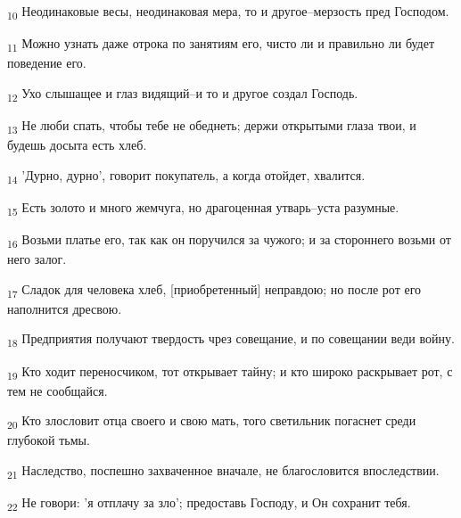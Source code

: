 \begin{tcolorbox}
\textsubscript{10} Неодинаковые весы, неодинаковая мера, то и другое--мерзость пред Господом.
\end{tcolorbox}
\begin{tcolorbox}
\textsubscript{11} Можно узнать даже отрока по занятиям его, чисто ли и правильно ли будет поведение его.
\end{tcolorbox}
\begin{tcolorbox}
\textsubscript{12} Ухо слышащее и глаз видящий--и то и другое создал Господь.
\end{tcolorbox}
\begin{tcolorbox}
\textsubscript{13} Не люби спать, чтобы тебе не обеднеть; держи открытыми глаза твои, и будешь досыта есть хлеб.
\end{tcolorbox}
\begin{tcolorbox}
\textsubscript{14} 'Дурно, дурно', говорит покупатель, а когда отойдет, хвалится.
\end{tcolorbox}
\begin{tcolorbox}
\textsubscript{15} Есть золото и много жемчуга, но драгоценная утварь--уста разумные.
\end{tcolorbox}
\begin{tcolorbox}
\textsubscript{16} Возьми платье его, так как он поручился за чужого; и за стороннего возьми от него залог.
\end{tcolorbox}
\begin{tcolorbox}
\textsubscript{17} Сладок для человека хлеб, [приобретенный] неправдою; но после рот его наполнится дресвою.
\end{tcolorbox}
\begin{tcolorbox}
\textsubscript{18} Предприятия получают твердость чрез совещание, и по совещании веди войну.
\end{tcolorbox}
\begin{tcolorbox}
\textsubscript{19} Кто ходит переносчиком, тот открывает тайну; и кто широко раскрывает рот, с тем не сообщайся.
\end{tcolorbox}
\begin{tcolorbox}
\textsubscript{20} Кто злословит отца своего и свою мать, того светильник погаснет среди глубокой тьмы.
\end{tcolorbox}
\begin{tcolorbox}
\textsubscript{21} Наследство, поспешно захваченное вначале, не благословится впоследствии.
\end{tcolorbox}
\begin{tcolorbox}
\textsubscript{22} Не говори: 'я отплачу за зло'; предоставь Господу, и Он сохранит тебя.
\end{tcolorbox}
